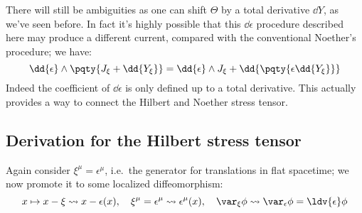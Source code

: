 \documentclass[a4paper
	,10pt
]{article}
\begin{document}
	\newparagraph
	There will still be ambiguities as one can shift $\Theta$ by a total derivative $\dd{Y}$, as we've seen before. In fact it's highly possible that this $\dd{\epsilon}$ procedure described here may produce a different current, compared with the conventional Noether's procedure; we have:
	\begin{equation}
		\dd{\epsilon} \wedge
			\pqty{J_\xi + \dd{Y_\xi}}
		= \dd{\epsilon} \wedge J_\xi
			+ \dd{\pqty{
				\epsilon \dd{Y_\xi}
			}}
	\end{equation}
	Indeed the coefficient of $\dd{\epsilon}$ is only defined up to a total derivative. 
	This actually provides a way to connect the Hilbert and Noether stress tensor. 
	
\subsection{Derivation for the Hilbert stress tensor}
	Again consider $\xi^\mu = \epsilon^\mu$, i.e.~the generator for translations in flat spacetime; we now promote it to some localized diffeomorphism:
	\begin{equation}
		x\mapsto x - \xi \leadsto x - \epsilon(x),
	\quad
		\xi^\mu = \epsilon^\mu
		\leadsto \epsilon^\mu(x),
	\quad
		\var_\xi \phi
		\leadsto \var_\epsilon \phi
		= \ldv{\epsilon} \phi
	\end{equation}
	
	
	
	
	
\vspace{1.2\baselineskip}
\pagebreak[4]
\raggedright
\printbibliography[%
	,heading = bibintoc
]
\end{document}

